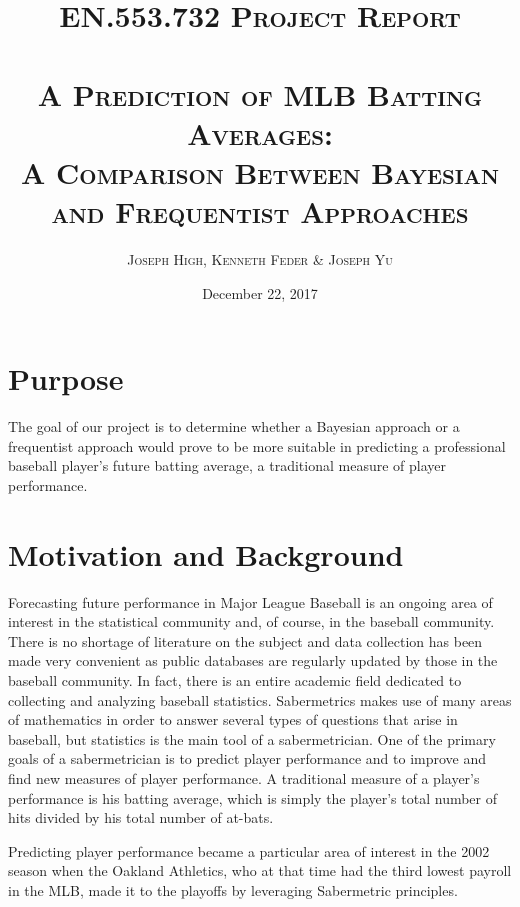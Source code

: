 \documentclass[10pt,a4paper]{article}
\begin{document}
\title{\vspace{-3cm} \textsc{\normalsize EN.553.732  Project Report}\\ \text{} \\ \textsc{\large A Prediction of MLB Batting Averages: \\ A Comparison Between Bayesian and Frequentist Approaches}}
\author{\textsc{\normalsize Joseph High, Kenneth Feder \& Joseph Yu}}
\date{\small December 22, 2017}
\maketitle

\section*{\large Purpose} 
The goal of our project is to determine whether a Bayesian approach or a frequentist approach would prove to be more suitable in predicting a professional baseball player's future batting average, a traditional measure of player performance. 
\section*{\large Motivation and Background} 
Forecasting future performance in Major League Baseball is an ongoing area of interest in the statistical community and, of course, in the baseball community. There is no shortage of literature on the subject and data collection has been made very convenient as public databases are regularly updated by those in the baseball community. In fact, there is an entire academic field dedicated to collecting and analyzing baseball statistics. Sabermetrics makes use of many areas of mathematics in order to answer several types of questions that arise in baseball, but statistics is the main tool of a sabermetrician. One of the primary goals of a sabermetrician is to predict player performance and to improve and find new measures of player performance. A traditional measure of a player's performance is his batting average, which is simply the player's total number of hits divided by his total number of at-bats. \par 
Predicting player performance became a particular area of interest in the 2002 season when the Oakland Athletics, who at that time had the third lowest payroll in the MLB, made it to the playoffs by leveraging Sabermetric principles.
\end{document}
